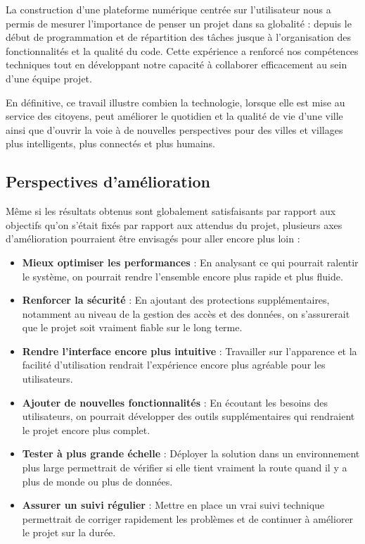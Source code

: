 \documentclass[a4paper,12pt]{report}
\begin{document}
	La construction d’une plateforme numérique centrée sur l’utilisateur nous a permis de mesurer l’importance de penser un projet dans sa globalité : depuis le début de programmation et de répartition des tâches jusque à l'organisation des fonctionnalités et la qualité du code. Cette expérience a renforcé nos compétences techniques tout en développant notre capacité à collaborer efficacement au sein d'une équipe projet.
	
	En définitive, ce travail illustre combien la technologie, lorsque elle est mise au service des citoyens, peut améliorer le quotidien et la qualité de vie d'une ville ainsi que d'ouvrir la voie à de nouvelles perspectives pour des villes et villages plus intelligents, plus connectés et plus humains.
	
	\subsection{Perspectives d'amélioration}
	
	Même si les résultats obtenus sont globalement satisfaisants par rapport aux objectifs qu'on s'était fixés par rapport aux attendus du projet, plusieurs axes d'amélioration pourraient être envisagés pour aller encore plus loin :
	
	\begin{itemize}
		\item \textbf{Mieux optimiser les performances} : En analysant ce qui pourrait ralentir le système, on pourrait rendre l'ensemble encore plus rapide et plus fluide.
		
		\item \textbf{Renforcer la sécurité} : En ajoutant des protections supplémentaires, notamment au niveau de la gestion des accès et des données, on s'assurerait que le projet soit vraiment fiable sur le long terme.
		
		\item \textbf{Rendre l’interface encore plus intuitive} : Travailler sur l'apparence et la facilité d’utilisation rendrait l’expérience encore plus agréable pour les utilisateurs.
		
		\item \textbf{Ajouter de nouvelles fonctionnalités} : En écoutant les besoins des utilisateurs, on pourrait développer des outils supplémentaires qui rendraient le projet encore plus complet.
		
		\item \textbf{Tester à plus grande échelle} : Déployer la solution dans un environnement plus large permettrait de vérifier si elle tient vraiment la route quand il y a plus de monde ou plus de données.
		
		\item \textbf{Assurer un suivi régulier} : Mettre en place un vrai suivi technique permettrait de corriger rapidement les problèmes et de continuer à améliorer le projet sur la durée.
	\end{itemize}
\end{document}

